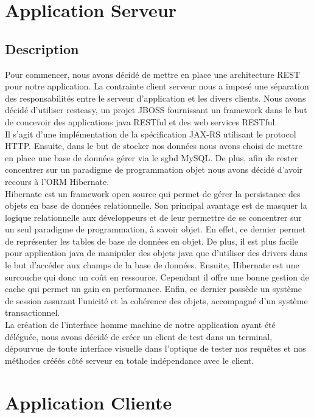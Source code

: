 \newpage
\section{Application Serveur}
\subsection{Description}
Pour commencer, nous avons décidé de mettre en place une architecture REST pour notre application. La contrainte client serveur nous a imposé
une séparation des responsabilités entre le serveur d'application et les divers clients. 
Nous avons décidé d'utiliser resteasy, un projet JBOSS fournissant un framework dans le but de concevoir des applications java RESTful et des web services RESTful.\\
Il s'agit d'une implémentation de la spécification JAX-RS utilisant le protocol HTTP.
Ensuite, dans le but de stocker nos données nous avons choisi de mettre en place une base de données gérer via le sgbd MySQL. De plus, afin de rester concentrer
sur un paradigme de programmation objet nous avons décidé d'avoir recours à l'ORM Hibernate. 
\\
Hibernate est un framework open source qui permet de gérer la persistance des objets en base de données relationnelle.
Son principal avantage est de masquer la logique relationnelle aux développeurs et de leur permettre de se concentrer
sur un seul paradigme de programmation, à savoir objet. En effet, ce dernier permet de représenter les tables de base 
de données en objet. De plus, il est plus facile pour application java de manipuler des objets java que d'utiliser
des drivers dans le but d'accéder aux champs de la base de données. Ensuite, Hibernate est une surcouche qui donc 
un coût en ressource. Cependant il offre une bonne gestion de cache qui permet un gain en performance. Enfin, ce dernier
possède un système de session assurant l'unicité et la cohérence des objets, accompagné d'un système transactionnel.
\\
La création de l'interface homme machine de notre application ayant été déléguée, nous avons décidé de créer un client de test dans un terminal, dépourvue de toute interface visuelle dans l'optique de tester nos requêtes et nos méthodes crééés côté serveur en totale indépendance avec le client.




\newpage
\section{Application Cliente}
